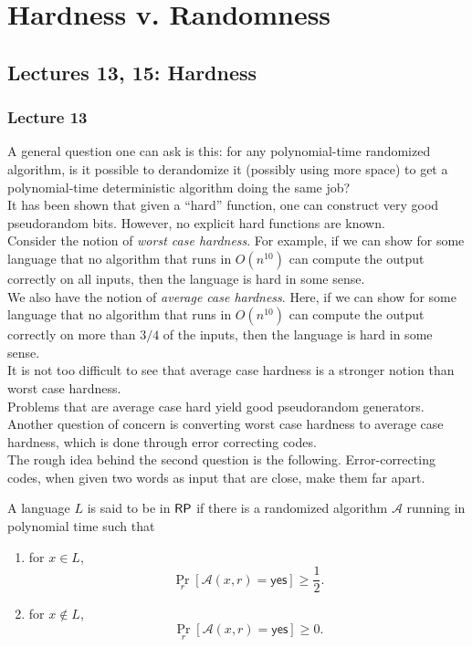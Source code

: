\section{Hardness v. Randomness}

\subsection{Lectures 13, 15: Hardness}

	\subsubsection{Lecture 13}

		A general question one can ask is this: for any polynomial-time randomized algorithm, is it possible to derandomize it (possibly using more space) to get a polynomial-time deterministic algorithm doing the same job?\\
		It has been shown that given a ``hard'' function, one can construct very good pseudorandom bits. However, no explicit hard functions are known.\\

		Consider the notion of \emph{worst case hardness}. For example, if we can show for some language that no algorithm that runs in $O(n^{10})$ can compute the output correctly on all inputs, then the language is hard in some sense.\\
		We also have the notion of \emph{average case hardness}. Here, if we can show for some language that no algorithm that runs in $O(n^{10})$ can compute the output correctly on more than $3/4$ of the inputs, then the language is hard in some sense.\\
		It is not too difficult to see that average case hardness is a stronger notion than worst case hardness.\\

		Problems that are average case hard yield good pseudorandom generators. Another question of concern is converting worst case hardness to average case hardness, which is done through error correcting codes.\\
		The rough idea behind the second question is the following. Error-correcting codes, when given two words as input that are close, make them far apart.

		\begin{fdef}[$\RP$]
			A language $L$ is said to be in $\RP$ if there is a randomized algorithm $\mathcal{A}$ running in polynomial time such that
			\begin{enumerate}
				\item for $x \in L$,
				\[ \Pr_{r} \left[\mathcal{A}(x,r) = \mathsf{yes}\right] \ge \frac{1}{2}. \]
				\item for $x \not\in L$,
				\[ \Pr_{r} \left[\mathcal{A}(x,r) = \mathsf{yes}\right] \ge 0. \]
			\end{enumerate}
		\end{fdef}


